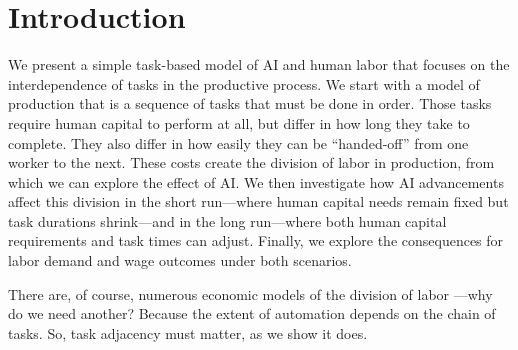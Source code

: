 \documentclass{article}
\theoremstyle{plain}
\theoremstyle{plain}
\begin{document}
\onehalfspacing

\section{Introduction}
We present a simple task-based model of AI and human labor that focuses on the interdependence of tasks in the productive process.
We start with a model of production that is a sequence of tasks that must be done in order.
Those tasks require human capital to perform at all, but differ in how long they take to complete.
They also differ in how easily they can be ``handed-off'' from one worker to the next.
These costs create the division of labor in production, from which we can explore the effect of AI.
We then investigate how AI advancements affect this division in the short run---where human capital needs remain fixed but task durations shrink---and in the long run---where both human capital requirements and task times can adjust.
Finally, we explore the consequences for labor demand and wage outcomes under both scenarios.

There are, of course, numerous economic models of the division of labor \citep{becker1992division, deming2017growing}---why do we need another?
Because the extent of automation depends on the chain of tasks. 
So, task adjacency must matter, as we show it does.
\end{document}
